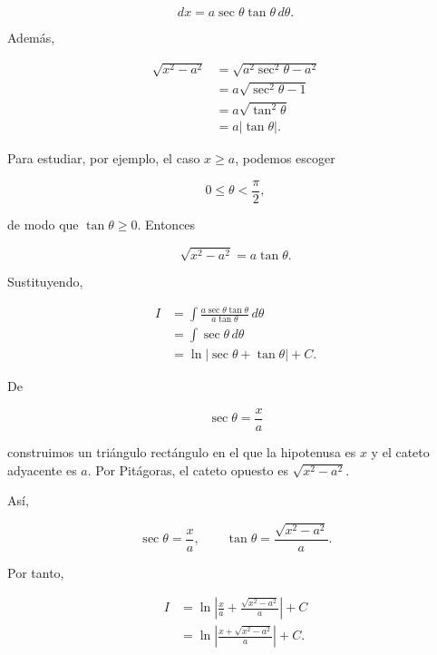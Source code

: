 \documentclass[12pt]{article}
\theoremstyle{definition}
\theoremstyle{remark}
\begin{document}
\[
dx=a\sec\theta\tan\theta\,d\theta.
\]

Además,

\begin{align*}
\sqrt{x^2-a^2}
&=\sqrt{a^2\sec^2\theta-a^2}\\
&=a\sqrt{\sec^2\theta-1}\\
&=a\sqrt{\tan^2\theta}\\
&=a|\tan\theta|.
\end{align*}

Para estudiar, por ejemplo, el caso $x\ge a$, podemos escoger

\[
0\leq\theta<\frac{\pi}{2},
\]

de modo que $\tan\theta\ge0$. Entonces

\[
\sqrt{x^2-a^2}=a\tan\theta.
\]

Sustituyendo,

\begin{align*}
I
&=\int
\frac{a\sec\theta\tan\theta}
     {a\tan\theta}\,d\theta\\
&=\int\sec\theta\,d\theta\\
&=\ln|\sec\theta+\tan\theta|+C.
\end{align*}

De

\[
\sec\theta=\frac{x}{a}
\]

construimos un triángulo rectángulo en el que la hipotenusa es $x$ y el
cateto adyacente es $a$. Por Pitágoras, el cateto opuesto es
$\sqrt{x^2-a^2}$.

\begin{center}
\end{center}

Así,

\[
\sec\theta=\frac{x}{a},
\qquad
\tan\theta=\frac{\sqrt{x^2-a^2}}{a}.
\]

Por tanto,

\begin{align*}
I
&=\ln\left|
\frac{x}{a}+\frac{\sqrt{x^2-a^2}}{a}
\right|+C\\
&=\ln\left|
\frac{x+\sqrt{x^2-a^2}}{a}
\right|+C.
\end{align*}
\end{document}
